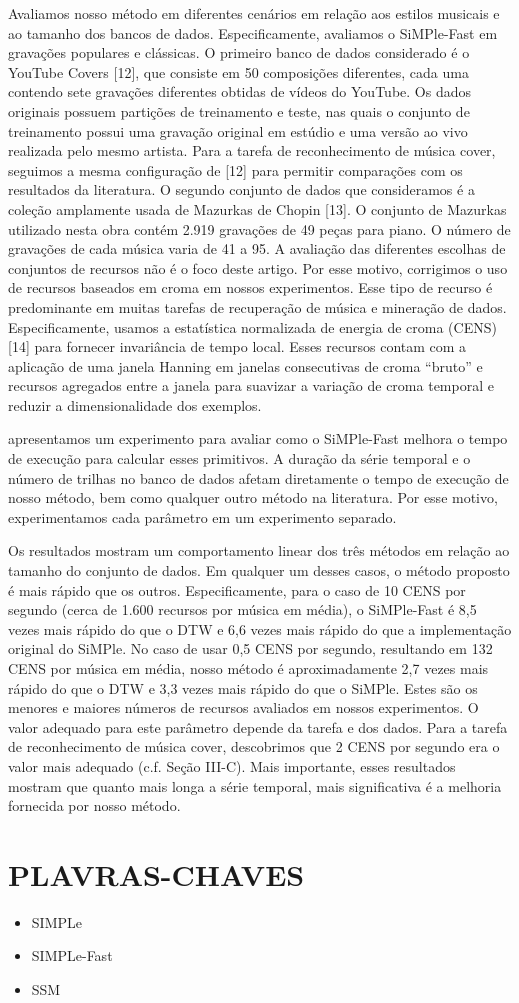\documentclass{article}
\begin{document}
Avaliamos nosso método em diferentes cenários em relação aos estilos musicais e ao tamanho dos bancos de dados. Especificamente, avaliamos o SiMPle-Fast em gravações populares e clássicas. O primeiro banco de dados considerado é o YouTube Covers [12], que consiste em 50 composições diferentes, cada uma contendo sete gravações diferentes obtidas de vídeos do YouTube. Os dados originais possuem partições de treinamento e teste, nas quais o conjunto de treinamento possui uma gravação original em estúdio e uma versão ao vivo realizada pelo mesmo artista. Para a tarefa de reconhecimento de música cover, seguimos a mesma configuração de [12] para permitir comparações com os resultados da literatura. O segundo conjunto de dados que consideramos é a coleção amplamente usada de Mazurkas de Chopin [13]. O conjunto de Mazurkas utilizado nesta obra contém 2.919 gravações de 49 peças para piano. O número de gravações de cada música varia de 41 a 95. A avaliação das diferentes escolhas de conjuntos de recursos não é o foco deste artigo. Por esse motivo, corrigimos o uso de recursos baseados em croma em nossos experimentos. Esse tipo de recurso é predominante em muitas tarefas de recuperação de música e mineração de dados. Especificamente, usamos a estatística normalizada de energia de croma (CENS) [14] para fornecer invariância de tempo local. Esses recursos contam com a aplicação de uma janela Hanning em janelas consecutivas de croma “bruto” e recursos agregados entre a janela para suavizar a variação de croma temporal e reduzir a dimensionalidade dos exemplos.

apresentamos um experimento para avaliar como o SiMPle-Fast melhora o tempo de execução para calcular esses primitivos. A duração da série temporal e o número de trilhas no banco de dados afetam diretamente o tempo de execução de nosso método, bem como qualquer outro método na literatura. Por esse motivo, experimentamos cada parâmetro em um experimento separado.

Os resultados mostram um comportamento linear dos três métodos em relação ao tamanho do conjunto de dados. Em qualquer um desses casos, o método proposto é mais rápido que os outros. Especificamente, para o caso de 10 CENS por segundo (cerca de 1.600 recursos por música em média), o SiMPle-Fast é 8,5 vezes mais rápido do que o DTW e 6,6 vezes mais rápido do que a implementação original do SiMPle. No caso de usar 0,5 CENS por segundo, resultando em 132 CENS por música em média, nosso método é aproximadamente 2,7 vezes mais rápido do que o DTW e 3,3 vezes mais rápido do que o SiMPle. Estes são os menores e maiores números de recursos avaliados em nossos experimentos. O valor adequado para este parâmetro depende da tarefa e dos dados. Para a tarefa de reconhecimento de música cover, descobrimos que 2 CENS por segundo era o valor mais adequado (c.f. Seção III-C).
Mais importante, esses resultados mostram que quanto mais longa a série temporal, mais significativa é a melhoria fornecida por nosso método.

\section{PLAVRAS-CHAVES}

\begin{itemize}
    \item SIMPLe
    \item SIMPLe-Fast
    \item SSM
\end{itemize}
\end{document}
